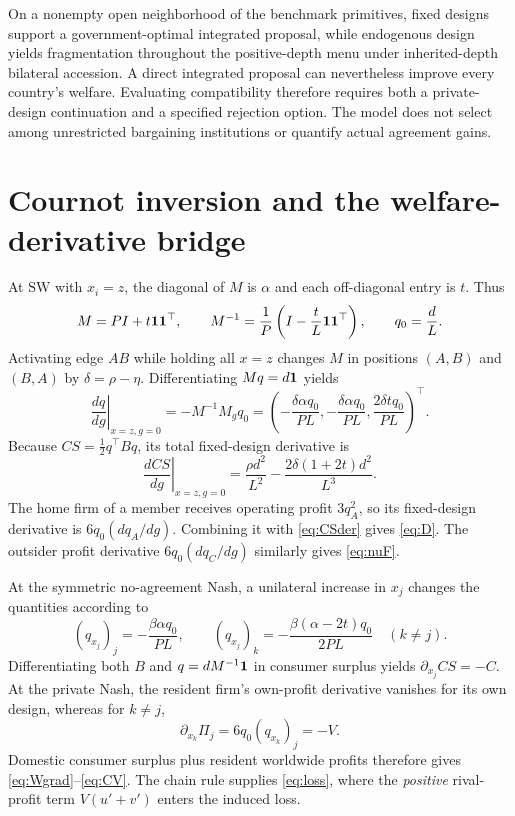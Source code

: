 \documentclass[11pt,a4paper]{article}
\theoremstyle{remark}\newtheorem{remark}[theorem]{Remark}
\newcommand{\SW}{\mathrm{SW}}\newcommand{\SU}{\mathrm{SU}}\newcommand{\IS}{\mathrm{IS}}
\begin{document}
On a nonempty open neighborhood of the benchmark primitives, fixed designs support a government-optimal integrated proposal, while endogenous design yields fragmentation throughout the positive-depth menu under inherited-depth bilateral accession. A direct integrated proposal can nevertheless improve every country's welfare. Evaluating compatibility therefore requires both a private-design continuation and a specified rejection option. The model does not select among unrestricted bargaining institutions or quantify actual agreement gains.

\appendix
\section{Cournot inversion and the welfare-derivative bridge}\label{app:bridge}
At $\SW$ with $x_i=z$, the diagonal of $M$ is $\alpha$ and each off-diagonal entry is $t$. Thus
\begin{equation}\label{eq:inv}
M=P I+t\boldsymbol{1}\boldsymbol{1}^{\top},\qquad
M^{-1}=\frac1P\left(I-\frac{t}{L}\boldsymbol{1}\boldsymbol{1}^{\top}\right),\qquad q_0=\frac dL.
\end{equation}
Activating edge $AB$ while holding all $x=z$ changes $M$ in positions $(A,B)$ and $(B,A)$ by $\delta=\rho-\eta$. Differentiating $Mq=d\boldsymbol{1}$ yields
\begin{equation}\label{eq:quantityDer}
\left.\frac{dq}{dg}\right|_{x=z,g=0}=-M^{-1}M_gq_0
=\left(-\frac{\delta\alpha q_0}{PL},-\frac{\delta\alpha q_0}{PL},\frac{2\delta t q_0}{PL}\right)^\top.
\end{equation}
Because $CS=\tfrac12q^\top Bq$, its total fixed-design derivative is
\begin{equation}\label{eq:CSder}
\left.\frac{dCS}{dg}\right|_{x=z,g=0}
=\frac{\rho d^2}{L^2}-\frac{2\delta(1+2t)d^2}{L^3}.
\end{equation}
The home firm of a member receives operating profit $3q_A^2$, so its fixed-design derivative is $6q_0(dq_A/dg)$. Combining it with \eqref{eq:CSder} gives \eqref{eq:D}. The outsider profit derivative $6q_0(dq_C/dg)$ similarly gives \eqref{eq:nuF}.

At the symmetric no-agreement Nash, a unilateral increase in $x_j$ changes the quantities according to
\begin{equation}\label{eq:designQuantityBridge}
(q_{x_j})_j=-\frac{\beta\alpha q_0}{PL},\qquad
(q_{x_j})_k=-\frac{\beta(\alpha-2t)q_0}{2PL}\quad(k\ne j).
\end{equation}
Differentiating both $B$ and $q=dM^{-1}\boldsymbol{1}$ in consumer surplus yields $\partial_{x_j}CS=-C$. At the private Nash, the resident firm's own-profit derivative vanishes for its own design, whereas for $k\ne j$,
\begin{equation}\label{eq:crossProfitBridge}
\partial_{x_k}\Pi_j=6q_0(q_{x_k})_j=-V.
\end{equation}
Domestic consumer surplus plus resident worldwide profits therefore gives \eqref{eq:Wgrad}--\eqref{eq:CV}. The chain rule supplies \eqref{eq:loss}, where the \emph{positive} rival-profit term $V(u'+v')$ enters the induced loss.
\end{document}
